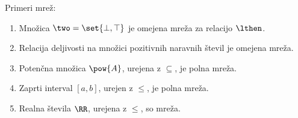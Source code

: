 \begin{zgled}
  Primeri mrež:
  \begin{enumerate}
  \item Množica $\two = \set{\bot, \top}$ je omejena mreža za relacijo $\lthen$.
  \item Relacija deljivosti na množici pozitivnih naravnih števil je omejena mreža.
  \item Potenčna množica $\pow{A}$, urejena z $\subseteq$, je polna mreža.
  \item Zaprti interval $[a,b]$, urejen z $\leq$, je polna mreža.
  \item Realna števila $\RR$, urejena z $\leq$, so mreža.
  \end{enumerate}
\end{zgled}
